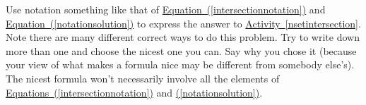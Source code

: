 \documentclass{book}
\begin{document}
\setcounter{project}{221}
\addtocounter{project}{-1}
\begin{activity}[]\label{inclusion-exclusionunion}
\hypertarget{p-1233}{}%
Use notation something like that of \hyperref[intersectionnotation]{Equation~(\ref{intersectionnotation})} and \hyperref[notationsolution]{Equation~(\ref{notationsolution})} to express the answer to \hyperref[nsetintersection]{Activity~\ref{nsetintersection}}. Note there are many different correct ways to do this problem. Try to write down more than one and choose the nicest one you can. Say why you chose it (because your view of what makes a formula nice may be different from somebody else's). The nicest formula won't necessarily involve all the elements of \hyperref[intersectionnotation]{Equations~(\ref{intersectionnotation})} and \hyperref[notationsolution]{(\ref{notationsolution})}.%
\end{activity}
\end{document}
